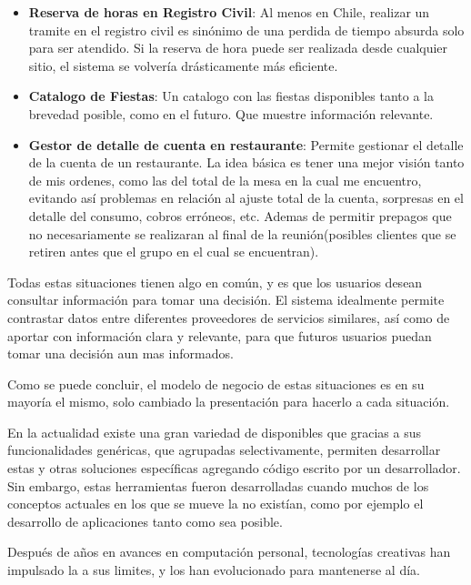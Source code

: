 \begin{itemize}
	\item \textbf{Reserva de horas en Registro Civil}: Al menos en Chile, realizar un tramite en el registro civil es sinónimo de una perdida de tiempo absurda solo para ser atendido. Si la reserva de hora puede ser realizada desde cualquier sitio, el sistema se volvería drásticamente más eficiente.
	
	\item \textbf{Catalogo de Fiestas}: Un catalogo con las fiestas disponibles tanto a la brevedad posible, como en el futuro. Que muestre información relevante.
	
	\item \textbf{Gestor de detalle de cuenta en restaurante}: Permite gestionar el detalle de la cuenta de un restaurante. La idea básica es tener una mejor visión tanto de mis ordenes, como las del total de la mesa en la cual me encuentro, evitando así problemas en relación al ajuste total de la cuenta, sorpresas en el detalle del consumo, cobros erróneos, etc. Ademas de permitir prepagos que no necesariamente se realizaran al final de la reunión(posibles clientes que se retiren antes que el grupo en el cual se encuentran).
	
\end{itemize}

Todas estas situaciones tienen algo en común, y es que los usuarios desean consultar información para tomar una decisión. El sistema idealmente permite contrastar datos entre diferentes proveedores de servicios similares, así como de aportar con información clara y relevante, para que futuros usuarios puedan tomar una decisión aun mas informados.

Como se puede concluir, el modelo de negocio de estas situaciones es en su mayoría el mismo, solo cambiado la presentación para hacerlo \adhoc a cada situación.

En la actualidad existe una gran variedad de \frameworksPC disponibles que gracias a sus funcionalidades genéricas, que agrupadas selectivamente, permiten  desarrollar estas y otras soluciones específicas agregando código escrito por un desarrollador. Sin embargo, estas herramientas fueron desarrolladas cuando muchos de los conceptos actuales en los que se mueve la \internet no existían, como por ejemplo el desarrollo de aplicaciones \realTimeINT tanto como sea posible.

Después de años en avances en computación personal, tecnologías creativas han impulsado la \webINT a sus limites, y los \webINT \browsersINT han evolucionado para mantenerse al día.

